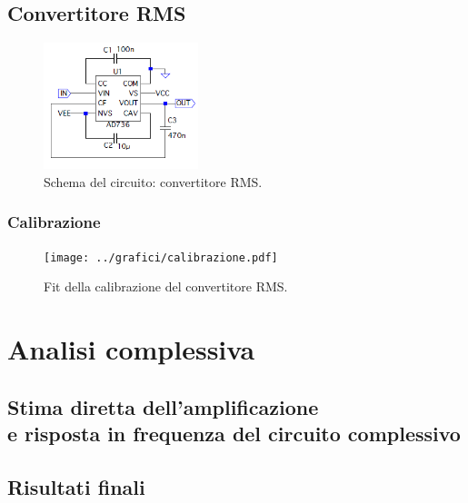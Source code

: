 \documentclass[a4paper,10pt]{article}
\begin{document}
\subsection{Convertitore RMS}

\begin{figure}
	\vspace{-10pt}
	\centering
	\includegraphics[width=0.4\textwidth]{../grafici/RMSconverter.png}
	\vspace{-12pt}
	\caption{Schema del circuito: convertitore RMS.}
	\label{fig:powamp}
	\vspace{-6pt}
\end{figure}

\lipsum[2-5]

\subsubsection*{Calibrazione}

\lipsum[4]

\begin{figure}[H]
	\centering
	\texttt{[image: ../grafici/calibrazione.pdf]}
	\vspace*{10pt}
	\caption{Fit della calibrazione del convertitore RMS.}
	\label{fig:blocks}
\end{figure}

\section{Analisi complessiva} %

\subsection{Stima diretta dell'amplificazione \\e risposta in frequenza del circuito complessivo}

\lipsum[8]

\subsection{Risultati finali}

\lipsum[9]
\end{document}
